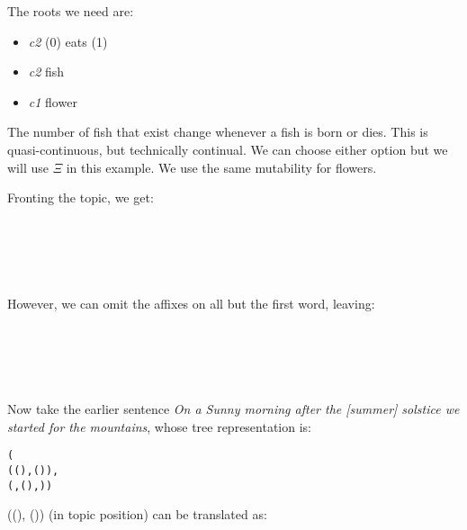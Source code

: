 \documentclass{book}
\begin{document}
The roots we need are:

\begin{itemize}
  \item {} \emph{c2} (0) eats (1)
  \item {} \emph{c2} fish
  \item {} \emph{c1} flower
\end{itemize}

The number of fish that exist change whenever a fish is born or dies. This is quasi-continuous, but technically continual. We can choose either option but we will use $\Xi$ in this example. We use the same mutability for flowers.

Fronting the topic, we get: \\
~\\
 \\
 \\
   \\
   \\

However, we can omit the affixes on all but the first word, leaving: \\
~\\
 \\
 \\
   \\
   \\

Now take the earlier sentence \emph{On a Sunny morning after the [summer] solstice we started for the mountains}, whose tree representation is:

\begin{alltt}
  \normalfont
  (
    ((), ()),
    (, (), ))
\end{alltt}

((), ()) (in topic position) can be translated as: \\
~\\
 \\
 \\
\hli{$\llcorner$} \hlii{$\llcorner$}   \hlv{$\llcorner$}    \\
\end{document}
